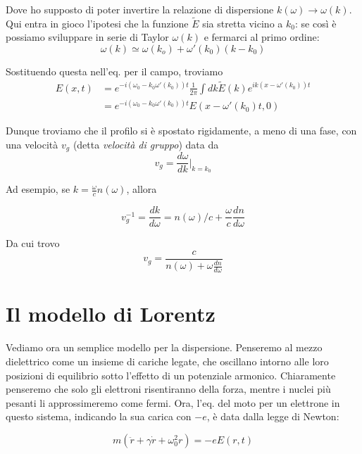 \documentclass{report}
\begin{document}
Dove ho supposto di poter invertire la relazione di dispersione $k(\omega) \rightarrow \omega(k)$. Qui entra in gioco l'ipotesi che la funzione $\tilde{E}$ sia stretta vicino a $k_0$: se così è possiamo sviluppare in serie di Taylor $\omega(k)$ e fermarci al primo ordine: 
\begin{equation}
    \omega(k) \simeq \omega(k_o) + \omega'(k_0)(k-k_0)
\end{equation}

Sostituendo questa nell'eq. per il campo, troviamo
\begin{align}
    E(x, t) &= e^{-i(\omega_0 - k_0\omega'(k_0))t}\frac{1}{2\pi}\int dk \tilde{E}(k)e^{ik(x - \omega'(k_0))t} \\ &= e^{-i(\omega_0 - k_0\omega'(k_0))t} E(x- \omega'(k_0)t, 0)
\end{align}

Dunque troviamo che il profilo si è spostato rigidamente, a meno di una fase, con una velocità $v_g$ (detta \emph{velocità di gruppo}) data da
\begin{equation}
    v_g = \frac{d\omega}{dk}\biggr|_{k=k_0}
\end{equation}

Ad esempio, se $k = \frac{\omega}{c}n(\omega)$, allora 

\begin{equation}
    v_g^{-1} = \frac{dk}{d\omega} = n(\omega)/c + \frac{\omega}{c}\frac{dn}{d\omega}
\end{equation}

Da cui trovo 
\begin{equation}
    v_g = \frac{c}{n(\omega) + \omega \frac{dn}{d\omega}}
\end{equation}

\section{Il modello di Lorentz}

Vediamo ora un semplice modello per la dispersione. Penseremo al mezzo dielettrico come un insieme di cariche legate, che oscillano intorno alle loro posizioni di equilibrio sotto l'effetto di un potenziale armonico. Chiaramente penseremo che solo gli elettroni risentiranno della forza, mentre i nuclei più pesanti li approssimeremo come fermi. Ora, l'eq. del moto per un elettrone in questo sistema, indicando la sua carica con $-e$, è data dalla legge di Newton:

\begin{equation}
    m(\ddot{r} + \gamma\dot{r} + \omega_0^2r) = -eE(r, t)
\end{equation}
\end{document}
